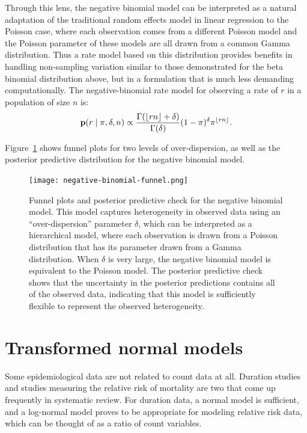 Through this lens, the negative binomial model can be interpreted as a
natural adaptation of the traditional random effects model in linear
regression to the Poisson case, where each observation comes from a
different Poisson model and the Poisson parameter of these models are
all drawn from a common Gamma distribution. Thus a rate model based on
this distribution provides benefits in handling non-sampling variation
similar to those demonstrated for the beta binomial distribution
above, but in a formulation that is much less demanding
computationally.  The negative-binomial rate model for observing a
rate of $r$ in a population of size $n$ is:
\[
\mathbf{p}(r\;|\; \pi, \delta, n) \propto
 \frac{\Gamma(\lfloor rn \rfloor+\delta)}{\Gamma(\delta)} (1-\pi)^\delta \pi^{\lfloor rn\rfloor}.
\]

Figure~\ref{rate-model-negative-binomial-funnel} shows funnel plots
for two levels of over-dispersion, as well as the posterior predictive
distribution for the negative binomial model.

\begin{figure}[ht]
\begin{center}
\texttt{[image: negative-binomial-funnel.png]}

\end{center}
\caption{Funnel plots and posterior predictive check for the negative
  binomial model. This model captures heterogeneity in observed data
  using an ``over-dispersion'' parameter $\delta$, which can be
  interpreted as a hierarchical model, where each observation is drawn
  from a Poisson distribution that has its parameter drawn from a
  Gamma distribution.  When $\delta$ is very large, the negative
  binomial model is equivalent to the Poisson model.  The posterior
  predictive check shows that the uncertainty in the posterior
  predictions contains all of the observed data, indicating that this
  model is sufficiently flexible to represent the observed
  heterogeneity.} \label{rate-model-negative-binomial-funnel}
\end{figure}

\section{Transformed normal models}
\label{transformed-normal-models}
Some epidemiological data are not related to count data at all.
Duration studies and studies measuring the relative risk of mortality
are two that come up frequently in systematic review.  For duration
data, a normal model is sufficient, and a log-normal model proves to
be appropriate for modeling relative risk data, which can be thought
of as a ratio of count variables.

